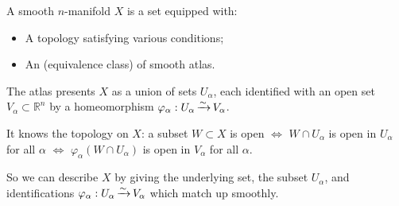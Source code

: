 \documentclass[a4paper,11pt]{article}
\begin{document}
	A smooth $n$-manifold $X$ is a set equipped with:
	\begin{itemize}
		\item A topology satisfying various conditions;
		\item An (equivalence class) of smooth atlas.
	\end{itemize}

	The atlas presents $X$ as a union of sets $U_\alpha$, each identified with an open set $V_\alpha \subset \mathbb{R}^n$ by a homeomorphism $\varphi_\alpha: U_\alpha \operatorname{\xrightarrow{\sim}} V_\alpha$.

	It knows the topology on $X$: a subset $W \subset X$ is open $\Leftrightarrow$ $W \cap U_\alpha$ is open in $U_\alpha$ for all $\alpha$ $\Leftrightarrow$ $\varphi_\alpha(W\cap U_\alpha)$ is open in $V_\alpha$ for all $\alpha$.

	So we can describe $X$ by giving the underlying set, the subset $U_\alpha$, and identifications $\varphi_\alpha: U_\alpha \operatorname{\xrightarrow{\sim}} V_\alpha$ which match up smoothly.
\end{document}

